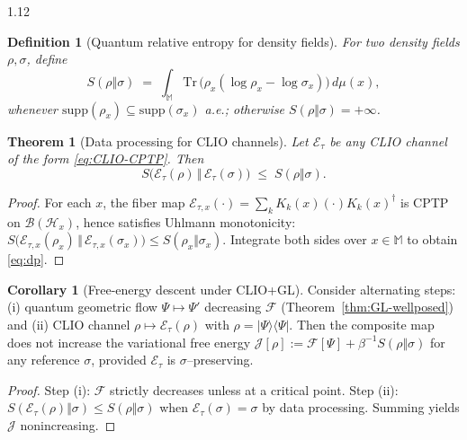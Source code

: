 \documentclass[12pt,a4paper]{article}
\numberwithin{equation}{section}
\newtheorem{definition}{Definition}[section]
\newtheorem{theorem}{Theorem}[section]
\theoremstyle{remark}
\theoremstyle{definition}
\newtheorem{corollary}{Corollary}[section]
\begin{document}
\begin{spacing}{1.12}
\begin{definition}[Quantum relative entropy for density fields]
For two density fields $\rho,\sigma$, define
\begin{equation}
\label{eq:bundle-relative-entropy}
S(\rho\Vert\sigma)\;=\;\int_{\mathbb{M}}\! \mathrm{Tr}\,\big(\rho_x(\log\rho_x-\log\sigma_x)\big)\,d\mu(x),
\end{equation}
whenever $\mathrm{supp}(\rho_x)\subseteq \mathrm{supp}(\sigma_x)$ a.e.; otherwise $S(\rho\Vert\sigma)=+\infty$.
\end{definition}

\begin{theorem}[Data processing for CLIO channels]
\label{thm:dp-inequality}
Let $\mathcal{E}_\tau$ be any CLIO channel of the form \eqref{eq:CLIO-CPTP}. Then
\begin{equation}
\label{eq:dp}
S\!\big(\mathcal{E}_\tau(\rho)\,\Vert\,\mathcal{E}_\tau(\sigma)\big)\;\le\; S(\rho\Vert\sigma).
\end{equation}
\end{theorem}

\begin{proof}
For each $x$, the fiber map $\mathcal{E}_{\tau,x}(\cdot)=\sum_k K_k(x)(\cdot)K_k(x)^\dagger$ is CPTP on $\mathcal{B}(\mathcal{H}_x)$, hence satisfies Uhlmann monotonicity:
$S\big(\mathcal{E}_{\tau,x}(\rho_x)\,\Vert\,\mathcal{E}_{\tau,x}(\sigma_x)\big)\le S(\rho_x\Vert\sigma_x)$.
Integrate both sides over $x\in\mathbb{M}$ to obtain \eqref{eq:dp}.
\end{proof}

\begin{corollary}[Free-energy descent under CLIO+\;GL]
\label{cor:free-energy-descent}
Consider alternating steps: (i) quantum geometric flow $\Psi\mapsto \Psi'$ decreasing $\mathcal{F}$ (Theorem~\ref{thm:GL-wellposed}) and (ii) CLIO channel $\rho\mapsto\mathcal{E}_\tau(\rho)$ with $\rho=|\Psi\rangle\!\langle\Psi|$.
Then the composite map does not increase the variational free energy $\mathcal{J}[\rho]:=\mathcal{F}[\Psi]+\beta^{-1}S(\rho\Vert\sigma)$ for any reference $\sigma$, provided $\mathcal{E}_\tau$ is $\sigma$–preserving.
\end{corollary}

\begin{proof}
Step (i): $\mathcal{F}$ strictly decreases unless at a critical point.
Step (ii): $S(\mathcal{E}_\tau(\rho)\Vert \sigma)\le S(\rho\Vert\sigma)$ when $\mathcal{E}_\tau(\sigma)=\sigma$ by data processing. Summing yields $\mathcal{J}$ nonincreasing.
\end{proof}


\end{spacing}
\end{document}
